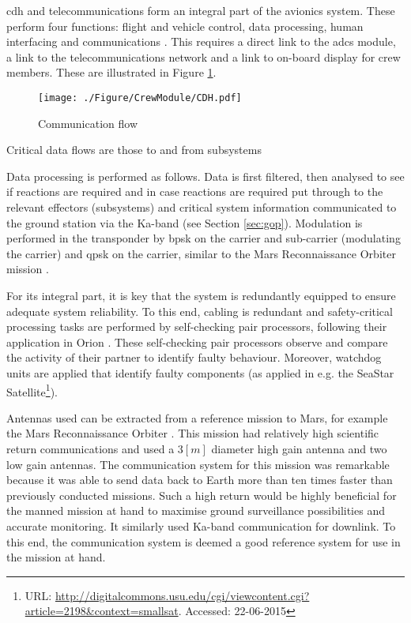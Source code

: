 \acrfull{cdh} and telecommunications form an integral part of the avionics system. These perform four functions: flight and vehicle control, data processing, human interfacing and communications \cite{Eger2008}. This requires a direct link to the \gls{adcs} module, a link to the telecommunications network and a link to on-board display for crew members. These are illustrated in Figure \ref{fig:cdhflow}.

\begin{figure}[h]
		\centering
		\texttt{[image: ./Figure/CrewModule/CDH.pdf]}
		\caption{Communication flow}
		\label{fig:cdhflow}
\end{figure}

Critical data flows are those to and from subsystems

Data processing is performed as follows. Data is first filtered, then analysed to see if reactions are required and in case reactions are required put through to the relevant effectors (subsystems) and critical system information communicated to the ground station via the Ka-band (see Section \ref{sec:gop}). Modulation is performed in the transponder by \gls{bpsk} on the carrier and sub-carrier (modulating the carrier) and \gls{qpsk} on the carrier, similar to the Mars Reconnaissance Orbiter mission \cite{Taylor2006}.

For its integral part, it is key that the system is redundantly equipped to ensure adequate system reliability. To this end, cabling is redundant and safety-critical processing tasks are performed by self-checking pair processors, following their application in Orion \cite{Eger2008}. These self-checking pair processors observe and compare the activity of their partner to identify faulty behaviour. Moreover, watchdog units are applied that identify faulty components (as applied in e.g. the SeaStar Satellite\footnote{URL: \url{http://digitalcommons.usu.edu/cgi/viewcontent.cgi?article=2198&context=smallsat}. Accessed: 22-06-2015}).

Antennas used can be extracted from a reference mission to Mars, for example the Mars Reconnaissance Orbiter \cite{Taylor2006}. This mission had relatively high scientific return communications and used a $3 \left[m\right]$ diameter high gain antenna and two low gain antennas. The communication system for this mission was remarkable because it was able to send data back to Earth more than ten times faster than previously conducted missions. Such a high return would be highly beneficial for the manned mission at hand to maximise ground surveillance possibilities and accurate monitoring. It similarly used Ka-band communication for downlink. To this end, the communication system is deemed a good reference system for use in the mission at hand.

